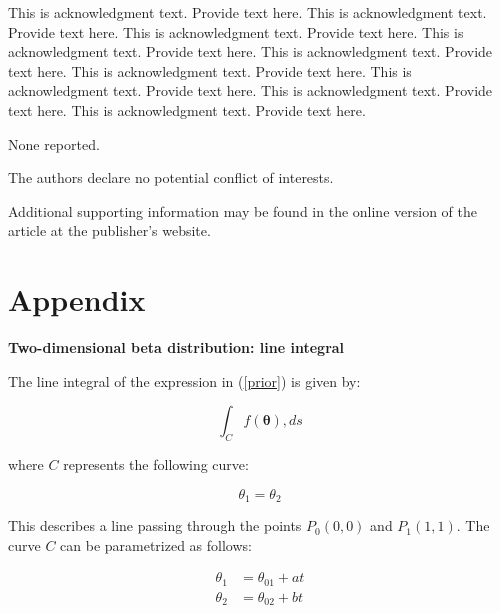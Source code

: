 \documentclass[AMA,Times1COL]{WileyNJDv5} %
\begin{document}
{}


This is acknowledgment text. \cite{Kenamond2013} Provide text here. This is acknowledgment text. Provide text here. This is acknowledgment text. Provide text here. This is acknowledgment text. Provide text here. This is acknowledgment text. Provide text here. This is acknowledgment text. Provide text here. This is acknowledgment text. Provide text here. This is acknowledgment text. Provide text here. This is acknowledgment text. Provide text here.



None reported.


The authors declare no potential conflict of interests.





Additional supporting information may be found in the
online version of the article at the publisher’s website.




\section*{Appendix} \label{appendix}

\textbf{Two-dimensional beta distribution: line integral}

The line integral of the expression in (\ref{prior}) is given by:

\begin{equation*} \int_C f(\boldsymbol{\theta}) , ds \end{equation*} \vspace{0.5cm}

where $C$ represents the following curve:

\begin{equation*}
    \theta_1 = \theta_2
\end{equation*}

This describes a line passing through the points $P_0(0,0)$ and $P_1(1,1)$. The curve $C$ can be parametrized as follows:

\begin{align*}
    \theta_1 &= \theta_{01} + at \\
    \theta_2 &= \theta_{02} + bt \\
\end{align*}
\end{document}
